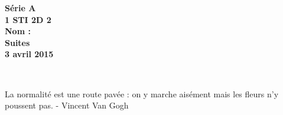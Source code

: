 \documentclass[12pt]{article}
\begin{document}

\begin{minipage}[t]{\textwidth}
  \raggedright
      {\bfseries Série A}\\[.35ex]
      {\bfseries 1 STI 2D 2}\\[.35ex]
      {\bfseries Nom : }\\[.35ex]
      \vspace*{-1cm}
      \raggedleft
          {\bfseries Suites}\\[.35ex]
          {\bfseries 3 avril 2015}\\[.35ex]
\end{minipage}\\[1em]

\begin{center}
  \textsf{La normalité est une route pavée : on y marche aisément mais les fleurs n'y poussent pas. - Vincent Van Gogh}\\
\end{center}

\setlength{\columnseprule}{1pt}
\end{document}
